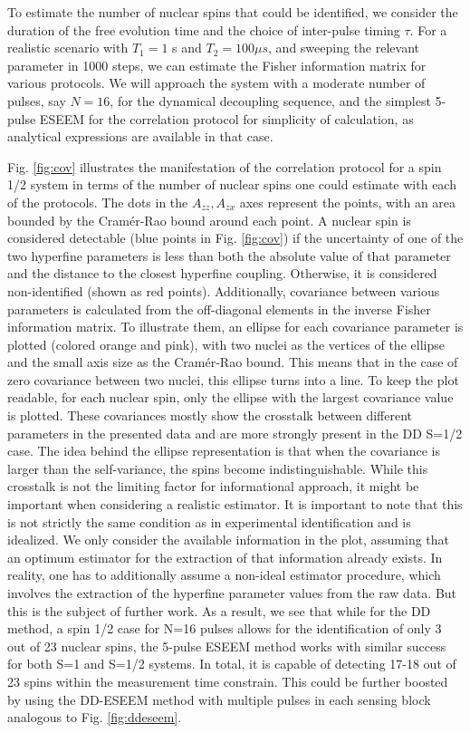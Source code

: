 \documentclass[%
 reprint,
superscriptaddress,
 amsmath,amssymb,
 aps,
]{revtex4-2}
\begin{document}
To estimate the number of nuclear spins that could be identified, we consider the duration of the free evolution time and the choice of inter-pulse timing $\tau$.
For a realistic scenario with $T_1 = 1$ s and $T_2 = 100 \mu s$, and sweeping the relevant parameter in 1000 steps, we can estimate the Fisher information matrix for various protocols.
We will approach the system with a moderate number of pulses, say $N=16$, for the dynamical decoupling sequence, and the simplest 5-pulse ESEEM for the correlation protocol for simplicity of calculation, as analytical expressions are available in that case.

Fig. \ref{fig:cov} illustrates the manifestation of the correlation protocol for a spin 1/2 system in terms of the number of nuclear spins one could estimate with each of the protocols.
The dots in the $A_{zz}, A_{zx}$ axes represent the points, with an area bounded by the Cramér-Rao bound around each point.
A nuclear spin is considered detectable (blue points in Fig. \ref{fig:cov}) if the uncertainty of one of the two hyperfine parameters is less than both the absolute value of that parameter and the distance to the closest hyperfine coupling.
Otherwise, it is considered non-identified (shown as red points). 
Additionally, covariance between various parameters is calculated from the off-diagonal elements in the inverse Fisher information matrix.
To illustrate them, an ellipse for each covariance parameter is plotted (colored orange and pink), with two nuclei as the vertices of the ellipse and the small axis size as the Cramér-Rao bound.
This means that in the case of zero covariance between two nuclei, this ellipse turns into a line.
To keep the plot readable, for each nuclear spin, only the ellipse with the largest covariance value is plotted.
These covariances mostly show the crosstalk between different parameters in the presented data and are more strongly present in the DD S=1/2 case. 
The idea behind the ellipse representation is that when the covariance is larger than the self-variance, the spins become indistinguishable.
While this crosstalk is not the limiting factor for informational approach, it might be important when considering a realistic estimator.
It is important to note that this is not strictly the same condition as in experimental identification and is idealized.
We only consider the available information in the plot, assuming that an optimum estimator for the extraction of that information already exists.
In reality, one has to additionally assume a non-ideal estimator procedure, which involves the extraction of the hyperfine parameter values from the raw data. But this is the subject of further work.
As a result, we see that while for the DD method, a spin 1/2 case for N=16 pulses allows for the identification of only 3 out of 23 nuclear spins, the 5-pulse ESEEM method works with similar success for both S=1 and S=1/2 systems. In total, it is capable of detecting 17-18 out of 23 spins within the measurement time constrain. This could be further boosted by using the DD-ESEEM method with multiple pulses in each sensing block analogous to Fig. \ref{fig:ddeseem}.
\end{document}
